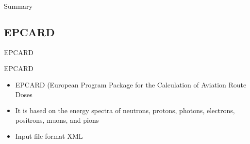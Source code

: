 \documentclass[aspectratio=1610]{beamer}
\newcommand{\semitransp}[2][35]{\color{fg!#1}#2}
\begin{document}
\begin{frame}
\begin{block}{Summary}
\end{block}

\begin{table}[t]

\caption{Flight Radiation}

\end{table}
\end{frame}




\subsection{\semitransp[40]{EPCARD}}

\begin{frame}{EPCARD}
\begin{block}{EPCARD}

\begin{itemize}

\item EPCARD (European Program Package for the Calculation of Aviation Route Doses
\item It is based on the energy spectra of neutrons, protons, photons, electrons, positrons, muons, and pions
\item Input file format XML
\end{itemize}

\end{block}
\end{frame}
\end{document}
